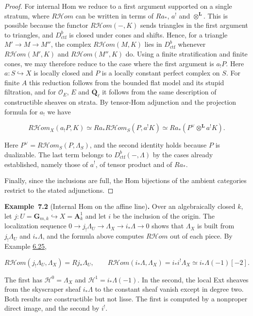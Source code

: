 \documentclass[11pt]{article}
\newenvironment{bpstatement}[2]{\par\addvspace{0.6\baselineskip}\noindent\textbf{#1}#2\textbf{.}\enspace\ignorespaces}
  {\par\addvspace{0.4\baselineskip}}
\providecommand{\cHom}{}\renewcommand{\cHom}{R\mathcal{H}\!om}
\begin{document}
\begin{proof}[{Proof}]
For internal Hom we reduce to a first argument supported on a single stratum, where \(\cHom\) can be written in terms of \(Ra_*\), \(a^!\) and \(\otimes^{\mathbf L}\). This is possible because the functor \(\cHom(-,K)\) sends triangles in the first argument to triangles, and \(D^b_{\mathrm{ctf}}\) is closed under cones and shifts. Hence, for a triangle \(M'\to M\to M''\), the complex \(\cHom(M,K)\) lies in \(D^b_{\mathrm{ctf}}\) whenever \(\cHom(M',K)\) and \(\cHom(M'',K)\) do. Using a finite stratification and finite cones, we may therefore reduce to the case where the first argument is \(a_!P\). Here \(a:S\hookrightarrow X\) is locally closed and \(P\) is a locally constant perfect complex on \(S\). For finite \(A\) this reduction follows from the bounded flat model and its stupid filtration, and for \(\mathcal O_E\), \(E\) and \(\overline{\mathbf Q}_\ell\) it follows from the same description of constructible sheaves on strata. By tensor-Hom adjunction and the projection formula for \(a_!\) we have

\[
\cHom_X(a_!P,K)
\simeq Ra_*\cHom_S(P,a^!K)
\simeq Ra_*(P^\vee\otimes^{\mathbf L}a^!K).
\]

Here \(P^\vee=\cHom_S(P,\Lambda_S)\), and the second identity holds because \(P\) is dualizable. The last term belongs to \(D^b_{\mathrm{ctf}}(-,\Lambda)\) by the cases already established, namely those of \(a^!\), of tensor product and of \(Ra_*\).

Finally, since the inclusions are full, the Hom bijections of the ambient categories restrict to the stated adjunctions.
\end{proof}

\label{bp607}%
\begin{bpstatement}{Example~7.2}{ (Internal Hom on the affine line)}
Over an algebraically closed \(k\), let \(j:U=\mathbf G_{m,k}\hookrightarrow
X=\mathbf A^1_k\) and let \(i\) be the inclusion of the origin. The localization sequence \(0\to j_!\Lambda_U\to\Lambda_X\to i_*\Lambda\to0\) shows that \(\Lambda_X\) is built from \(j_!\Lambda_U\) and \(i_*\Lambda\), and the formula above computes \(\cHom\) out of each piece. By Example \hyperref[bp591]{6.25},

\[
\cHom(j_!\Lambda_U,\Lambda_X)=Rj_*\Lambda_U,
\qquad
\cHom(i_*\Lambda,\Lambda_X)=i_*i^!\Lambda_X\simeq i_*\Lambda(-1)[-2].
\]

The first has \(\mathcal H^0=\Lambda_X\) and \(\mathcal H^1=i_*\Lambda(-1)\). In the second, the local Ext sheaves from the skyscraper sheaf \(i_*\Lambda\) to the constant sheaf vanish except in degree two. Both results are constructible but not lisse. The first is computed by a nonproper direct image, and the second by \(i^!\).
\end{bpstatement}
\end{document}
